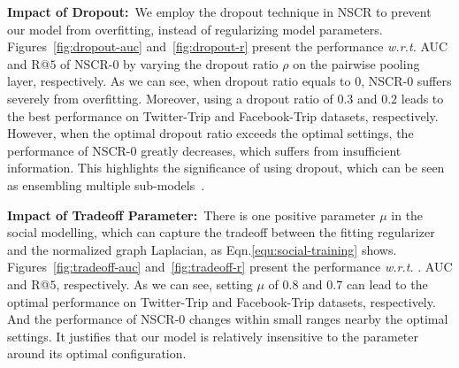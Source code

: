 \documentclass[sigconf]{acmart}
\newcommand{\wrt}{\emph{w.r.t. }}
\begin{document}
	\textbf{Impact of Dropout:}~We employ the dropout technique in NSCR to prevent our model from overfitting, instead of regularizing model parameters. Figures~\ref{fig:dropout-auc} and~\ref{fig:dropout-r} present the performance \wrt AUC and R@$5$ of NSCR-$0$ by varying the dropout ratio $\rho$ on the pairwise pooling layer, respectively. As we can see, when dropout ratio equals to $0$, NSCR-$0$ suffers severely from overfitting. Moreover, using a dropout ratio of $0.3$ and $0.2$ leads to the best performance on Twitter-Trip and Facebook-Trip datasets, respectively. However, when the optimal dropout ratio exceeds the optimal settings, the performance of NSCR-$0$ greatly decreases, which suffers from insufficient information. This highlights the significance of using dropout, which can be seen as ensembling multiple sub-models~\cite{DBLP:journals/jmlr/SrivastavaHKSS14}.
	
	\textbf{Impact of Tradeoff Parameter:}~There is one positive parameter $\mu$ in the social modelling, which can capture the tradeoff between the fitting regularizer and the normalized graph Laplacian, as Eqn.\eqref{equ:social-training} shows. Figures~\ref{fig:tradeoff-auc} and~\ref{fig:tradeoff-r} present the performance \wrt. AUC and R@$5$, respectively. As we can see, setting $\mu$ of $0.8$ and $0.7$ can lead to the optimal performance on Twitter-Trip and Facebook-Trip datasets, respectively. And the performance of NSCR-$0$ changes within small ranges nearby the optimal settings. It justifies that our model is relatively insensitive to the parameter around its optimal configuration.
	
\end{document}
